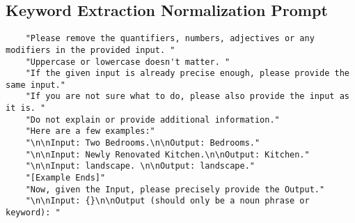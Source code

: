 \subsection{Keyword Extraction Normalization Prompt}
\label{app: keyword_normalization_prompt}
\begin{lstlisting}
    "Please remove the quantifiers, numbers, adjectives or any modifiers in the provided input. "
    "Uppercase or lowercase doesn't matter. "
    "If the given input is already precise enough, please provide the same input."
    "If you are not sure what to do, please also provide the input as it is. "
    "Do not explain or provide additional information."
    "Here are a few examples:"
    "\n\nInput: Two Bedrooms.\n\nOutput: Bedrooms."
    "\n\nInput: Newly Renovated Kitchen.\n\nOutput: Kitchen."
    "\n\nInput: landscape. \n\nOutput: landscape."
    "[Example Ends]"
    "Now, given the Input, please precisely provide the Output."
    "\n\nInput: {}\n\nOutput (should only be a noun phrase or keyword): "
\end{lstlisting}

